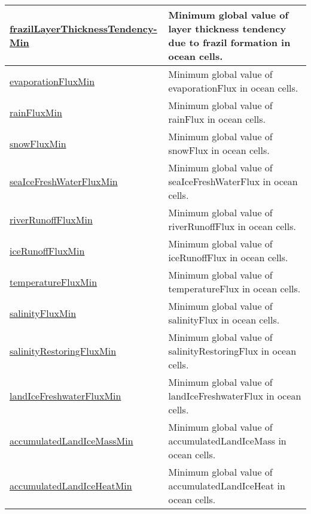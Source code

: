 {\begin{center}
\begin{longtable}{| p{2.0in} | p{4.0in} |}
    \hline
    \hyperref[subsec:var_sec_globalStatsAM_frazilLayerThicknessTendencyMin]{frazilLayerThicknessTendency-}\hyperref[subsec:var_sec_globalStatsAM_frazilLayerThicknessTendencyMin]{Min}  & Minimum global value of layer thickness tendency due to frazil formation in ocean cells. \\
    \hline
    \hyperref[subsec:var_sec_globalStatsAM_evaporationFluxMin]{evaporationFluxMin} & Minimum global value of evaporationFlux in ocean cells. \\
    \hline
    \hyperref[subsec:var_sec_globalStatsAM_rainFluxMin]{rainFluxMin} & Minimum global value of rainFlux in ocean cells. \\
    \hline
    \hyperref[subsec:var_sec_globalStatsAM_snowFluxMin]{snowFluxMin} & Minimum global value of snowFlux in ocean cells. \\
    \hline
    \hyperref[subsec:var_sec_globalStatsAM_seaIceFreshWaterFluxMin]{seaIceFreshWaterFluxMin} & Minimum global value of seaIceFreshWaterFlux in ocean cells. \\
    \hline
    \hyperref[subsec:var_sec_globalStatsAM_riverRunoffFluxMin]{riverRunoffFluxMin} & Minimum global value of riverRunoffFlux in ocean cells. \\
    \hline
    \hyperref[subsec:var_sec_globalStatsAM_iceRunoffFluxMin]{iceRunoffFluxMin} & Minimum global value of iceRunoffFlux in ocean cells. \\
    \hline
    \hyperref[subsec:var_sec_globalStatsAM_temperatureFluxMin]{temperatureFluxMin} & Minimum global value of temperatureFlux in ocean cells. \\
    \hline
    \hyperref[subsec:var_sec_globalStatsAM_salinityFluxMin]{salinityFluxMin} & Minimum global value of salinityFlux in ocean cells. \\
    \hline
    \hyperref[subsec:var_sec_globalStatsAM_salinityRestoringFluxMin]{salinityRestoringFluxMin} & Minimum global value of salinityRestoringFlux in ocean cells. \\
    \hline
    \hyperref[subsec:var_sec_globalStatsAM_landIceFreshwaterFluxMin]{landIceFreshwaterFluxMin} & Minimum global value of landIceFreshwaterFlux in ocean cells. \\
    \hline
    \hyperref[subsec:var_sec_globalStatsAM_accumulatedLandIceMassMin]{accumulatedLandIceMassMin} & Minimum global value of accumulatedLandIceMass in ocean cells. \\
    \hline
    \hyperref[subsec:var_sec_globalStatsAM_accumulatedLandIceHeatMin]{accumulatedLandIceHeatMin} & Minimum global value of accumulatedLandIceHeat in ocean cells. \\

\end{longtable}
\end{center}}

